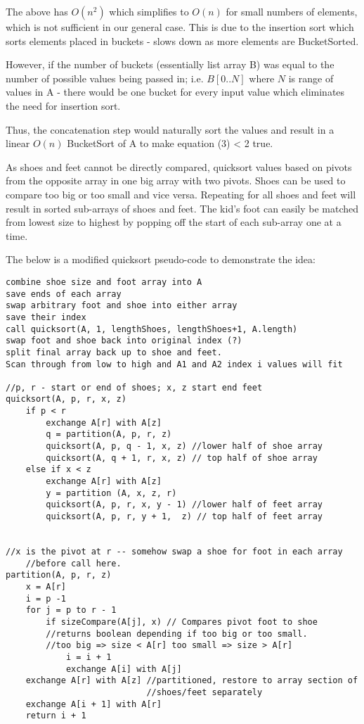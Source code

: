 \documentclass[11pt, a4paper]{article}
\begin{document}
The above has $O(n^2)$ which simplifies to $O(n)$ for small numbers of elements, which is not sufficient in our general case. This is due to the insertion sort which sorts elements placed in buckets - slows down as more elements are BucketSorted.

However, if the number of buckets (essentially list array B) was equal to the number of possible values being passed in; i.e. $B[0..N]$ where $N$ is range of values in A - there would be one bucket for every input value which eliminates the need for insertion sort.

  Thus, the concatenation step would naturally sort the values and result in a linear $O(n)$ BucketSort of A to make equation (3) < 2 true.


  \vspace{40mm}


As shoes and feet cannot be directly compared, quicksort values based on pivots from the opposite array in one big array with two pivots. Shoes can be used to compare too big or too small and vice versa. Repeating for all shoes and feet will result in sorted sub-arrays of shoes and feet. The kid's foot can easily be matched from lowest size to highest by popping off the start of each sub-array one at a time.

The below is a modified quicksort pseudo-code to demonstrate the idea:

\begin{lstlisting}[frame = single]
combine shoe size and foot array into A
save ends of each array
swap arbitrary foot and shoe into either array
save their index
call quicksort(A, 1, lengthShoes, lengthShoes+1, A.length)
swap foot and shoe back into original index (?)
split final array back up to shoe and feet. 
Scan through from low to high and A1 and A2 index i values will fit 

//p, r - start or end of shoes; x, z start end feet
quicksort(A, p, r, x, z)
    if p < r 
        exchange A[r] with A[z]
        q = partition(A, p, r, z)
        quicksort(A, p, q - 1, x, z) //lower half of shoe array
        quicksort(A, q + 1, r, x, z) // top half of shoe array
    else if x < z
        exchange A[r] with A[z]
        y = partition (A, x, z, r)
        quicksort(A, p, r, x, y - 1) //lower half of feet array
        quicksort(A, p, r, y + 1,  z) // top half of feet array
       

//x is the pivot at r -- somehow swap a shoe for foot in each array 
    //before call here.
partition(A, p, r, z)
    x = A[r]
    i = p -1
    for j = p to r - 1
        if sizeCompare(A[j], x) // Compares pivot foot to shoe 
        //returns boolean depending if too big or too small.
        //too big => size < A[r] too small => size > A[r]
            i = i + 1
            exchange A[i] with A[j]
    exchange A[r] with A[z] //partitioned, restore to array section of 
                            //shoes/feet separately
    exchange A[i + 1] with A[r]
    return i + 1

    \end{lstlisting}
\end{document}
